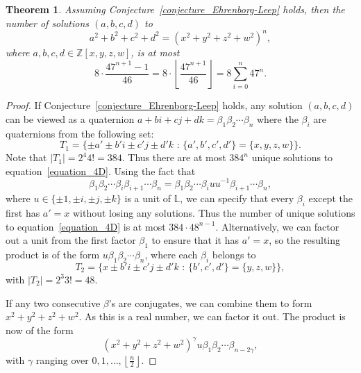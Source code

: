 \documentclass[12pt,table]{article}
\newtheorem{theorem}{Theorem}[section]
\theoremstyle{definition}
\theoremstyle{remark}
\newcommand{\Zzz}{\mathbb Z}
\newcommand{\Lll}{\mathbb L}
\numberwithin{equation}{section}
\begin{document}
\begin{theorem}
\label{theorem_counting_4D}
Assuming Conjecture~\ref{conjecture_Ehrenborg-Leep} holds,
then the number of solutions $ (a, b, c, d) $ to
\begin{equation}
\label{equation_4D}
a^2 + b^2 + c^2 + d^2 = (x^2 + y^2 + z^2 + w^2)^n,
\end{equation}
where $ a, b, c, d \in \Zzz[x,y,z,w]$,
is at most
\[
8 \cdot \frac{47^{n+1} - 1}{46}
=  8 \cdot \left\lfloor \frac{ 47^{n+1} }{46} \right\rfloor
=  8 \sum_{i = 0}^n{47^n}.
\]
\end{theorem}
\begin{proof}
If Conjecture~\ref{conjecture_Ehrenborg-Leep} holds, any
solution
$ (a, b, c, d) $ can be viewed as a quaternion
$ a + bi + cj + dk = \beta_1 \beta_2 \cdots \beta_n $
where the $\beta_i$ are quaternions from the following set:
\[
T_1 = \{ \pm a' \pm b'i \pm c'j \pm d'k
\text{ : } \{ a', b', c', d' \} = \{ x, y, z, w \} \}. 
\]
Note that $ | T_1 | = 2^4 4! = 384 $.
Thus there are at most $ 384^n $ unique solutions to equation~\ref{equation_4D}.
Using the fact that
\[
\beta_1 \beta_2 \cdots \beta_i \beta_{i+1} \cdots \beta_n
=
\beta_1 \beta_2 \cdots \beta_i u u^{-1} \beta_{i+1} \cdots \beta_n,
\]
where $ u \in \{ \pm 1 , \pm i, \pm j, \pm k \} $ is a unit of $\Lll$,
we can specify
that every $\beta_i$ except the first has $ a' = x $ without
losing any solutions. Thus the number of unique solutions
to equation~\ref{equation_4D} is at most
$ 384 \cdot 48^{n-1} $. Alternatively, we can factor out a unit
from the first factor $\beta_1$ to ensure that it has $ a' = x $, so the
resulting product is of the form $ u \beta_1 \beta_2 \cdots \beta_n $,
where each $ \beta_i $ belongs to
\[
T_2 = \{ x \pm b'i \pm c'j \pm d'k
\text{ : } \{ b', c', d' \} = \{ y, z, w \} \},
\]
with $ | T_2 | = 2^3 3! = 48 $.

If any two consecutive $ \beta $'s are conjugates, we can combine them
to form $ x^2 + y^2 + z^2 + w^2 $. As this is a real number, we can
factor it out. The product is now of the form
\[
(x^2 + y^2 + z^2 + w^2)^\gamma u \beta_1 \beta_2 \cdots \beta_{n-2\gamma},
\]
with $ \gamma $ ranging over $ 0, 1, \ldots, \left\lfloor \frac{n}{2} \right\rfloor $.


\end{proof}
\end{document}
